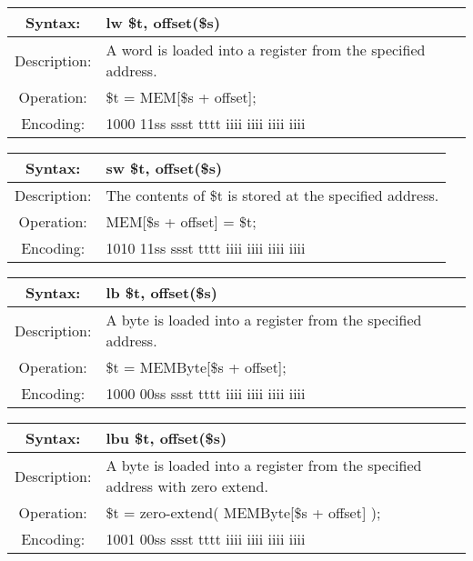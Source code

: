     \begin{table}[!hbp]
    \begin{tabularx}{\textwidth}{|c|X|}
        \hline
        Syntax: & lw \$t, offset(\$s) \\
        \hline
        Description: & A word is loaded into a register from the specified address. \\
        \hline
        Operation: & \$t = MEM[\$s + offset]; \\
        \hline
        Encoding: & 1000 11ss ssst tttt iiii iiii iiii iiii \\
        \hline
    \end{tabularx}
    \end{table}

    \begin{table}[!hbp]
    \begin{tabularx}{\textwidth}{|c|X|}
        \hline
        Syntax: & sw \$t, offset(\$s) \\
        \hline
        Description: & The contents of \$t is stored at the specified address. \\
        \hline
        Operation: & MEM[\$s + offset] = \$t; \\
        \hline
        Encoding: & 1010 11ss ssst tttt iiii iiii iiii iiii \\
        \hline
    \end{tabularx}
    \end{table}

    \begin{table}[!hbp]
    \begin{tabularx}{\textwidth}{|c|X|}
        \hline
        Syntax: & lb \$t, offset(\$s) \\
        \hline
        Description: & A byte is loaded into a register from the specified address. \\
        \hline
        Operation: & \$t = MEMByte[\$s + offset]; \\
        \hline
        Encoding: & 1000 00ss ssst tttt iiii iiii iiii iiii \\
        \hline
    \end{tabularx}
    \end{table}

    \begin{table}[!hbp]
    \begin{tabularx}{\textwidth}{|c|X|}
        \hline
        Syntax: & lbu \$t, offset(\$s) \\
        \hline
        Description: & A byte is loaded into a register from the specified address with zero extend. \\
        \hline
        Operation: & \$t = zero-extend( MEMByte[\$s + offset] ); \\
        \hline
        Encoding: & 1001 00ss ssst tttt iiii iiii iiii iiii \\
        \hline
    \end{tabularx}
    \end{table}

